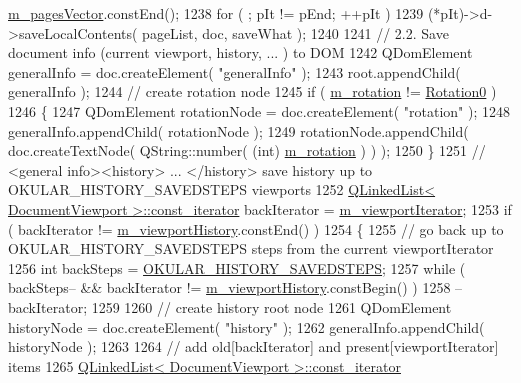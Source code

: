 \begin{DoxyCode}
      \hyperlink{classOkular_1_1DocumentPrivate_a73b852d9a73ffe8061b66dbf9b290f17}{m\_pagesVector}.constEnd();
1238         \textcolor{keywordflow}{for} ( ; pIt != pEnd; ++pIt )
1239             (*pIt)->d->saveLocalContents( pageList, doc, saveWhat );
1240 
1241         \textcolor{comment}{// 2.2. Save document info (current viewport, history, ... ) to DOM}
1242         QDomElement generalInfo = doc.createElement( \textcolor{stringliteral}{"generalInfo"} );
1243         root.appendChild( generalInfo );
1244         \textcolor{comment}{// create rotation node}
1245         \textcolor{keywordflow}{if} ( \hyperlink{classOkular_1_1DocumentPrivate_a5b7f4c2b5937d311b277c2e90826ee1b}{m\_rotation} != \hyperlink{namespaceOkular_a8556d00465f61ef533c6b027669e7da6aa4df8fc3dd09e30520c264c8d23d89c2}{Rotation0} )
1246         \{
1247             QDomElement rotationNode = doc.createElement( \textcolor{stringliteral}{"rotation"} );
1248             generalInfo.appendChild( rotationNode );
1249             rotationNode.appendChild( doc.createTextNode( QString::number( (\textcolor{keywordtype}{int})
      \hyperlink{classOkular_1_1DocumentPrivate_a5b7f4c2b5937d311b277c2e90826ee1b}{m\_rotation} ) ) );
1250         \}
1251         \textcolor{comment}{// <general info><history> ... </history> save history up to OKULAR\_HISTORY\_SAVEDSTEPS viewports}
1252         \hyperlink{classQLinkedList}{QLinkedList< DocumentViewport >::const\_iterator} 
      backIterator = \hyperlink{classOkular_1_1DocumentPrivate_a81a62e8d31d0e7873cd5f5c1590fa2fc}{m\_viewportIterator};
1253         \textcolor{keywordflow}{if} ( backIterator != \hyperlink{classOkular_1_1DocumentPrivate_a47ead6a6650c01fb91ac512e55320f87}{m\_viewportHistory}.constEnd() )
1254         \{
1255             \textcolor{comment}{// go back up to OKULAR\_HISTORY\_SAVEDSTEPS steps from the current viewportIterator}
1256             \textcolor{keywordtype}{int} backSteps = \hyperlink{core_2document_8cpp_a9f7bf9ff3d480e38ff210bcf92f53353}{OKULAR\_HISTORY\_SAVEDSTEPS};
1257             \textcolor{keywordflow}{while} ( backSteps-- && backIterator != \hyperlink{classOkular_1_1DocumentPrivate_a47ead6a6650c01fb91ac512e55320f87}{m\_viewportHistory}.constBegin() )
1258                 --backIterator;
1259 
1260             \textcolor{comment}{// create history root node}
1261             QDomElement historyNode = doc.createElement( \textcolor{stringliteral}{"history"} );
1262             generalInfo.appendChild( historyNode );
1263 
1264             \textcolor{comment}{// add old[backIterator] and present[viewportIterator] items}
1265             \hyperlink{classQLinkedList}{QLinkedList< DocumentViewport >::const\_iterator} 

\end{DoxyCode}
